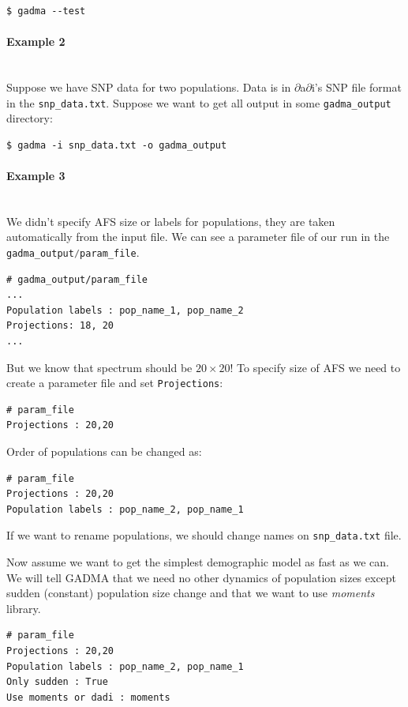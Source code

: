 \documentclass[12pt]{article}
\makeatletter
\newcommand{\dadi}{$\partial$a$\partial$i\xspace}
\newcommand{\moments}{\textit{moments}\xspace}
\newcommand{\py}[1]{\lstinline[language=Python, showstringspaces=False]@#1@}
\makeatother
\begin{document}
\begin{lstlisting}
$ gadma --test
\end{lstlisting}

\paragraph{Example 2}\mbox{}\\
Suppose we have SNP data for two populations. Data is in \dadi's SNP file format in the \py{snp_data.txt}. Suppose we want to get all output in some \py{gadma_output} directory:


\begin{lstlisting}
$ gadma -i snp_data.txt -o gadma_output
\end{lstlisting}


\paragraph{Example 3}\mbox{}\\
We didn't specify AFS size or labels for populations, they are taken automatically from the input file. We can see a parameter file of our run in the \py{gadma_output/param_file}. 
\begin{lstlisting}
# gadma_output/param_file
...
Population labels : pop_name_1, pop_name_2
Projections: 18, 20
...
\end{lstlisting}
But we know that spectrum should be $20 \times 20$! To specify size of AFS we need to create a parameter file and set \py{Projections}:

\begin{lstlisting}
# param_file
Projections : 20,20
\end{lstlisting}
Order of populations can be changed as:
\begin{lstlisting}
# param_file
Projections : 20,20
Population labels : pop_name_2, pop_name_1
\end{lstlisting}

If we want to rename populations, we should change names on \py{snp_data.txt} file.

Now assume we want to get the simplest demographic model as fast as we can. We will tell GADMA that we need no other dynamics of population sizes except sudden (constant) population size change and that we want to use \moments library.

\begin{lstlisting}
# param_file
Projections : 20,20
Population labels : pop_name_2, pop_name_1
Only sudden : True
Use moments or dadi : moments
\end{lstlisting}
\end{document}
